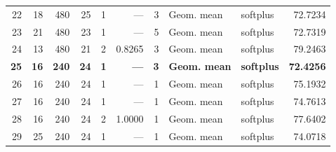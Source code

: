\begin{tabular}{@{}rrrrcrrllr@{}}
22 & 18 & 480 & 25 & 1 & --- & 3 & Geom. mean & softplus & 72.7234 \\
23 & 21 & 480 & 23 & 1 & --- & 5 & Geom. mean & softplus & 72.7319 \\
24 & 13 & 480 & 21 & 2 & 0.8265 & 3 & Geom. mean & softplus & 79.2463 \\
\textbf{25} & \textbf{16} & \textbf{240} & \textbf{24} & \textbf{1} & \textbf{---} & \textbf{3} & \textbf{Geom. mean} & \textbf{softplus} & \textbf{72.4256} \\
26 & 16 & 240 & 24 & 1 & --- & 1 & Geom. mean & softplus & 75.1932 \\
27 & 16 & 240 & 24 & 1 & --- & 1 & Geom. mean & softplus & 74.7613 \\
28 & 16 & 240 & 24 & 2 & 1.0000 & 1 & Geom. mean & softplus & 77.6402 \\
29 & 25 & 240 & 24 & 1 & --- & 1 & Geom. mean & softplus & 74.0718 \\
\bottomrule
\end{tabular}
